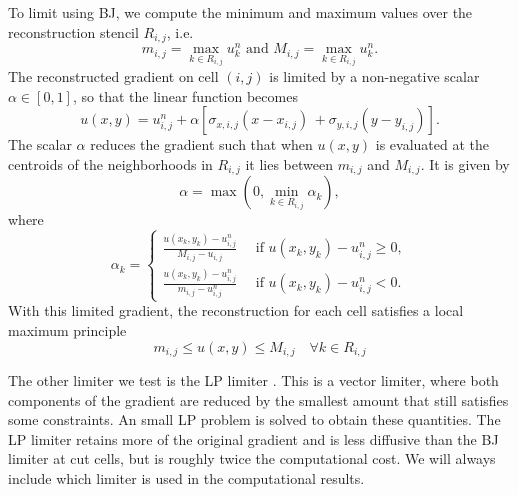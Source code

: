 To limit using BJ, we compute the minimum and maximum values over the
reconstruction stencil $R_{i,j}$, i.e.
\begin{equation}
     m_{i,j} = \max_{k \in R_{i,j}} {u}_k^n \text{ and } M_{i,j} = \max_{k \in R_{i,j}} 
     {u}_k^n.
\label{eqn:bj}
\end{equation}
The reconstructed gradient on cell $(i,j)$ is limited by a non-negative 
scalar $\alpha \in [0,1]$, so that the linear function becomes 
\begin{equation}
     u(x,y) = {u}_{i,j}^n + \alpha [{\sigma}_{x,i,j} ( x -  x_{i,j}) \, 
   + {\sigma}_{y,i,j}( y -  y_{i,j})].
\end{equation}
The scalar $\alpha$ reduces the gradient such that when ${u}(x,y)$ 
is evaluated at the centroids of the neighborhoods in $R_{i,j}$ it
lies between $m_{i,j}$ and $M_{i,j}$.
It is given by
$$
\alpha = \max\left(0,\min_{k \in R_{i,j}} \alpha_k \right),
$$
where
\begin{equation}
    \alpha_k = \begin{cases}
    \frac{{u}( x_{k},  y_{k}) - {u}_{i,j}^n}{M_{i,j} -
    {u}_{i,j}} \quad  \text{  if  } {u}( x_{k},  y_{k}) - {u}_{i,j}^n \geq 0,\\[.08in]
     \frac{{u}( x_{k},  y_{k}) - {u}_{i,j}^n}{m_{i,j} -
     {u}_{i,j}^n}  \quad \text{  if  } {u}(x_{k}, y_{k}) - {u}_{i,j}^n < 0.
    \end{cases}
\end{equation}
With this limited gradient, the reconstruction for each cell satisfies a
local maximum principle
\begin{equation}
m_{i,j} \le u(x,y) \le M_{i,j} \quad \forall k \in R_{i,j}
\end{equation}

The other limiter we test is the LP limiter 
\cite{May_Berger_LP}. This is a vector limiter, where both components of
the gradient are reduced by the smallest amount that still satisfies some
constraints. An small LP problem is solved to obtain these quantities.
The LP limiter retains more of the original gradient
and is less diffusive than the BJ limiter at cut cells, 
but is roughly twice the computational cost.
We will always include which limiter is used
in the computational results.  

